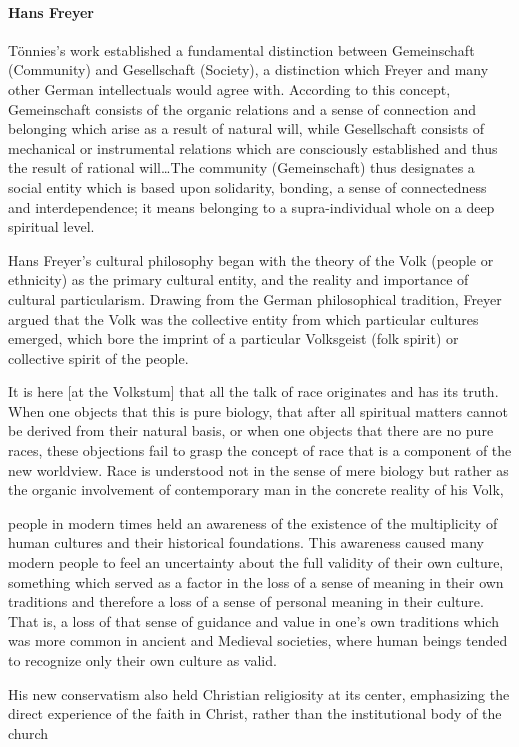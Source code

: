 \paragraph{Hans Freyer}
\begin{quotex}
Tönnies's work established a fundamental distinction between Gemeinschaft (Community) and Gesellschaft
(Society), a distinction which Freyer and many other German intellectuals would agree with. According to this concept,
Gemeinschaft consists of the organic relations and a sense of connection and belonging which arise as a result of
natural will, while Gesellschaft consists of mechanical or instrumental relations which are consciously established and
thus the result of rational will…The community (Gemeinschaft) thus designates a social entity which is based upon
solidarity, bonding, a sense of connectedness and interdependence; it means belonging to a supra-individual whole on a
deep spiritual level. 

Hans Freyer's cultural philosophy began with the theory of the Volk (people or ethnicity) as the primary
cultural entity, and the reality and importance of cultural particularism. Drawing from the German philosophical
tradition, Freyer argued that the Volk was the collective entity from which particular cultures emerged, which bore the
imprint of a particular Volksgeist (folk spirit) or collective spirit of the people.

It is here [at the Volkstum] that all the talk of race originates and has its truth. When one objects that this is pure
biology, that after all spiritual matters cannot be derived from their natural basis, or when one objects that there
are no pure races, these objections fail to grasp the concept of race that is a component of the new worldview. Race is
understood not in the sense of mere biology but rather as the organic involvement of contemporary man in the concrete
reality of his Volk,

people in modern times held an awareness of the existence of the multiplicity of human cultures and their historical
foundations. This awareness caused many modern people to feel an uncertainty about the full validity of their own
culture, something which served as a factor in the loss of a sense of meaning in their own traditions and therefore a
loss of a sense of personal meaning in their culture. That is, a loss of that sense of guidance and value in
one's own traditions which was more common in ancient and Medieval societies, where human beings tended to
recognize only their own culture as valid.

His new conservatism also held Christian religiosity at its center, emphasizing the direct experience of the faith in
Christ, rather than the institutional body of the church 

\end{quotex}
